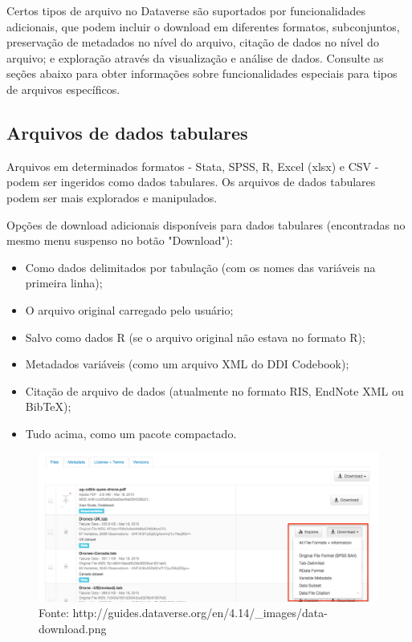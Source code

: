 \documentclass[12pt,hidelinks]{article}
\begin{document}
\qquad Certos tipos de arquivo no Dataverse são suportados por funcionalidades adicionais, que podem incluir o download em diferentes formatos, subconjuntos, preservação de metadados no nível do arquivo, citação de dados no nível do arquivo; e exploração através da visualização e análise de dados. Consulte as seções abaixo para obter informações sobre funcionalidades especiais para tipos de arquivos específicos.

    \subsection{Arquivos de dados tabulares}
    
\qquad Arquivos em determinados formatos - Stata, SPSS, R, Excel (xlsx) e CSV - podem ser ingeridos como dados tabulares. Os arquivos de dados tabulares podem ser mais explorados e manipulados.

Opções de download adicionais disponíveis para dados tabulares (encontradas no mesmo menu suspenso no botão "Download"):

\begin{itemize}

   \item Como dados delimitados por tabulação (com os nomes das variáveis na primeira linha);
   \item O arquivo original carregado pelo usuário;
   \item Salvo como dados R (se o arquivo original não estava no formato R);
   \item Metadados variáveis (como um arquivo XML do DDI Codebook);
   \item Citação de arquivo de dados (atualmente no formato RIS, EndNote XML ou BibTeX);
   \item Tudo acima, como um pacote compactado.

\end{itemize}
    
\begin{figure}[H]
                \centering
                \includegraphics[scale=0.3]{dttab.png}
                \caption{Fonte: http://guides.dataverse.org/en/4.14/\_images/data-download.png}
            \label{Tabulares}
        \end{figure}
    
\end{document}
